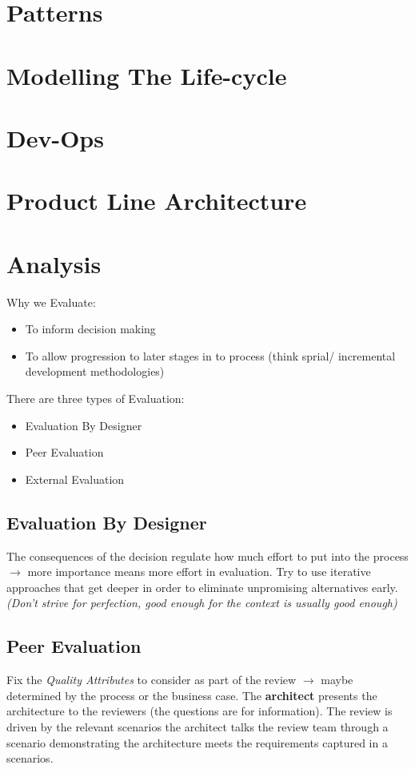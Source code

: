 \documentclass[a4paper]{article}
\begin{document}
\section{Patterns}

\section{Modelling The Life-cycle}

\section{Dev-Ops}

\section{Product Line Architecture}

\section{Analysis}
Why we Evaluate:
\begin{itemize}
\item To inform decision making
\item To allow progression to later stages in to process (think sprial/ incremental development methodologies)
\end{itemize}

There are three types of Evaluation:
\begin{itemize}
\item Evaluation By Designer
\item Peer Evaluation
\item External Evaluation
\end{itemize}

\subsection{Evaluation By Designer}
The consequences of the decision regulate how much effort to put into the process $\rightarrow$ more importance means more effort in evaluation. Try to use iterative approaches that get deeper in order to eliminate unpromising alternatives early. \textit{(Don't strive for perfection, good enough for the context is usually good enough)}

\subsection{Peer Evaluation}
Fix the \textit{Quality Attributes} to consider as part of the review $\rightarrow$  maybe determined by the process or the business case. The \textbf{architect} presents the architecture to the reviewers (the questions are for information). The review is driven by the relevant scenarios the architect talks the review team through a scenario demonstrating the architecture meets the requirements captured in a scenarios.
\end{document}
